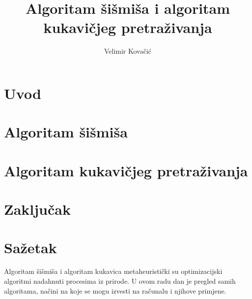 \documentclass[times, utf8, seminar]{fer}
\begin{document}
	
	\title{Algoritam šišmiša i algoritam kukavičjeg pretraživanja}
	
	\author{Velimir Kovačić}
	
	
	\maketitle
	
	\tableofcontents
	
	\chapter{Uvod}
	

	\chapter{Algoritam šišmiša}
	
	
	\chapter{Algoritam kukavičjeg pretraživanja}
	
	
	\chapter{Zaključak}
	
	
	
	
	\nocite{*}
	
	\chapter{Sažetak}
	\hspace{0.5cm}Algoritam šišmiša i algoritam kukavica metaheuristički su optimizacijski algoritmi nadahnuti procesima iz prirode. U ovom radu dan je pregled samih algoritama, načini na koje se mogu izvesti na računalu i njihove primjene.
	
\end{document}
